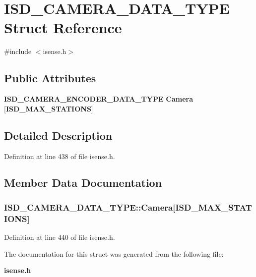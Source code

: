 \section{\-I\-S\-D\-\_\-\-C\-A\-M\-E\-R\-A\-\_\-\-D\-A\-T\-A\-\_\-\-T\-Y\-P\-E \-Struct \-Reference}
\label{structISD__CAMERA__DATA__TYPE}


{\ttfamily \#include $<$isense.\-h$>$}

\subsection*{\-Public \-Attributes}
\begin{DoxyCompactItemize}
\item 
{\bf \-I\-S\-D\-\_\-\-C\-A\-M\-E\-R\-A\-\_\-\-E\-N\-C\-O\-D\-E\-R\-\_\-\-D\-A\-T\-A\-\_\-\-T\-Y\-P\-E} {\bf \-Camera} [{\bf \-I\-S\-D\-\_\-\-M\-A\-X\-\_\-\-S\-T\-A\-T\-I\-O\-N\-S}]
\end{DoxyCompactItemize}


\subsection{\-Detailed \-Description}


\-Definition at line 438 of file isense.\-h.



\subsection{\-Member \-Data \-Documentation}
\subsubsection[{\-Camera}]{ {\bf \-I\-S\-D\-\_\-\-C\-A\-M\-E\-R\-A\-\_\-\-D\-A\-T\-A\-\_\-\-T\-Y\-P\-E\-::\-Camera}[{\bf \-I\-S\-D\-\_\-\-M\-A\-X\-\_\-\-S\-T\-A\-T\-I\-O\-N\-S}]}\label{structISD__CAMERA__DATA__TYPE_a4048add3184212a8806347ff0beaae06}


\-Definition at line 440 of file isense.\-h.



\-The documentation for this struct was generated from the following file\-:\begin{DoxyCompactItemize}
\item 
{\bf isense.\-h}\end{DoxyCompactItemize}
